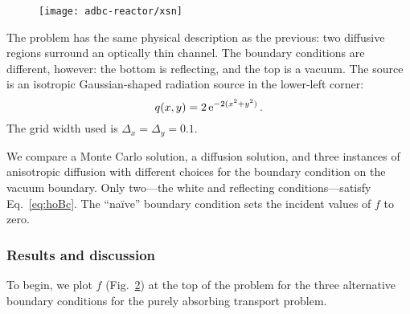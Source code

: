 \begin{figure}[htb]
  \centering
  \texttt{[image: adbc-reactor/xsn]}

  \label{fig:bcReactorProblem}
\end{figure}

The problem has the same physical description as the previous: two diffusive
regions surround an optically thin channel.
The boundary conditions are
different, however: the bottom is reflecting, and the top is a vacuum. 
The source is an isotropic Gaussian-shaped radiation source in the lower-left
corner:
\begin{equation*}
  q(x,y) = 2 \mathop{}\!\mathrm{e}^{-2 (x^2 + y^2) } \,.
\end{equation*}
The grid width used is $\Delta_x = \Delta_y = 0.1$.

We compare a Monte Carlo solution, a diffusion solution, and three instances of
anisotropic diffusion with different choices for the boundary condition on the
vacuum boundary. Only two---the white and reflecting
conditions---satisfy Eq.~\eqref{eq:hoBc}. The ``na\"ive'' boundary condition
sets the incident values of $f$ to zero.

\subsubsection{Results and discussion}

To begin, we plot $f$ (Fig.~\ref{fig:bcReactorF}) at the top of the problem for
the three alternative boundary conditions for the purely absorbing transport
problem.

\begin{figure}[tb]
  \centering
  \subfloat[$f(2.5,10,\omega)$]{%
    \hspace{-.25in}%
   \label{fig:bcReactorFchan}%
  }%
  \subfloat[$f(1.5,10,\omega)$]{%
    \hspace{-.25in}%
    
  }%
  \label{fig:bcReactorF}
\end{figure}

